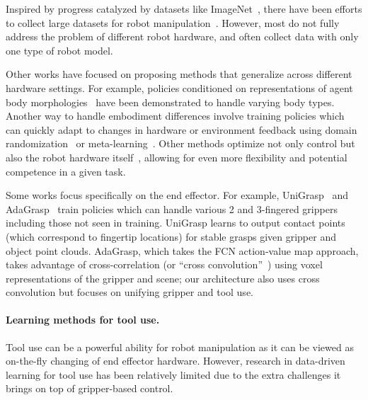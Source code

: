 \documentclass[10pt,twocolumn,letterpaper]{article}
\begin{document}
Inspired by progress catalyzed by datasets like ImageNet~\cite{krizhevsky2012imagenet}, there have been efforts to collect large datasets for robot manipulation~\cite{gupta2018robot, dasari2019robonet, mandlekar2018roboturk, jang2021bc, ebert2021bridge}. However, most do not fully address the problem of different robot hardware, and often collect data with only one type of robot model.


Other works have focused on proposing methods that generalize across different hardware settings. For example, policies conditioned on representations of agent body morphologies~\cite{wang2018nervenet, huang2020one, chen2018hardware} have been demonstrated to handle varying body types. Another way to handle embodiment differences involve training policies which can quickly adapt to changes in hardware or environment feedback using domain randomization~\cite{andrychowicz2020learning, kumar2021rma} or meta-learning~\cite{nagabandi2018learning}.
Other methods optimize not only control but also the robot hardware itself~\cite{ha2020fit2form, Xu-RSS-21}, allowing for even more flexibility and potential competence in a given task.

Some works focus specifically on the end effector. For example, UniGrasp~\cite{shao2020unigrasp} and AdaGrasp~\cite{xu2020adagrasp} train policies which can handle various 2 and 3-fingered grippers including those not seen in training. UniGrasp learns to output contact points (which correspond to fingertip locations) for stable grasps given gripper and object point clouds. AdaGrasp, which takes the FCN action-value map approach, takes advantage of cross-correlation (or ``cross convolution''~\cite{xue2016visual}) using voxel representations of the gripper and scene; our architecture also uses cross convolution but focuses on unifying gripper and tool use. 



\vspace{-10pt}



\paragraph{Learning methods for tool use.}
 Tool use can be a powerful ability for robot manipulation as it can be viewed as on-the-fly changing of end effector hardware. However, research in data-driven learning for tool use has been relatively limited due to the extra challenges it brings on top of gripper-based control.
 
\end{document}
